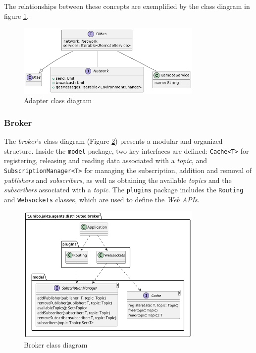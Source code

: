 The relationships between these concepts are exemplified by the class diagram in figure \ref{fig:class-dmas}.

\begin{figure}[ht!]
    \centering
    \includegraphics[width=0.8\textwidth]{figures/class-dmas.png}
    \caption{Adapter class diagram}
    \label{fig:class-dmas}
\end{figure}

\subsubsection{Broker}

The \textit{broker}'s class diagram (Figure \ref{fig:broker-class-diagram}) presents a modular and organized structure.
Inside the \texttt{model} package, two key interfaces are defined: \texttt{Cache<T>} for registering, releasing and reading data associated with a \textit{topic}, and \texttt{SubscriptionManager<T>} for managing the subscription, addition and removal of \textit{publishers} and \textit{subscribers}, as well as obtaining the available \textit{topics} and the \textit{subscribers} associated with a \textit{topic}.
The \texttt{plugins} package includes the \texttt{Routing} and \texttt{Websockets} classes, which are used to define the \textit{Web APIs}.

\begin{figure}[ht!]
    \centering
    \includegraphics[width=0.8\textwidth]{figures/broker-class-diagram.png}
    \caption{Broker class diagram}
    \label{fig:broker-class-diagram}
\end{figure}

